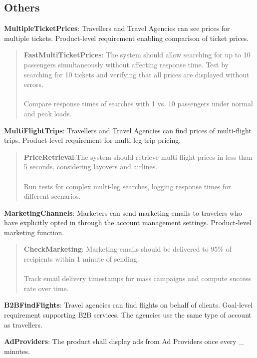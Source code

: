 \subsection{Others}
\textbf{MultipleTicketPrices}: Travellers and Travel Agencies can see prices for multiple tickets. Product-level requirement enabling comparison of ticket prices.
\begin{quote}
    \textbf{FastMultiTicketPrices}: The system should allow searching for up to 10 passengers simultaneously without affecting response time. Test by searching for 10 tickets and verifying that all prices are displayed without errors.\\ \\
     Compare response times of searches with 1 vs. 10 passengers under normal and peak loads.
\end{quote}
\textbf{MultiFlightTrips}: Travellers and Travel Agencies can find prices of multi-flight trips. Product-level requirement for multi-leg trip pricing.
    \begin{quote}
        \textbf{PriceRetrieval}:The system should retrieve multi-flight prices in less than 5 seconds, considering layovers and airlines. \\ \\ 
        Run tests for complex multi-leg searches, logging response times for different scenarios.
    \end{quote}
\textbf{MarketingChannels}: Marketers can send marketing emails to travelers who have explicitly opted in through the account management settings. Product-level marketing function.
\begin{quote}
    \textbf{CheckMarketing}: Marketing emails should be delivered to 95\% of recipients within 1 minute of sending. \\ \\
    Track email delivery timestamps for mass campaigns and compute success rate over time.
\end{quote}
\textbf{B2BFindFlights}: Travel agencies can find flights on behalf of clients. Goal-level requirement supporting B2B services. The agencies use the same type of account as travellers.

\textbf{AdProviders}: The product shall display ads from Ad Providers once every \_ minutes.

